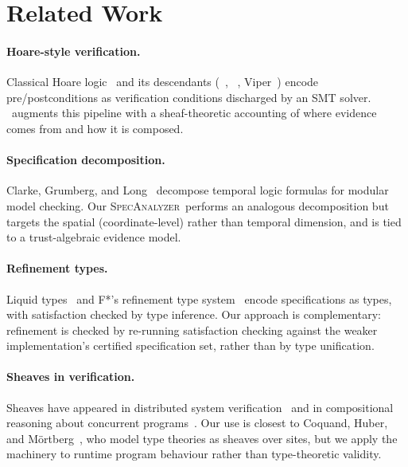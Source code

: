 \documentclass[11pt]{article}
\newcommand{\SpecAn}{\textsc{SpecAnalyzer}}         %
\begin{document}
\section{Related Work}\label{sec:related}

\paragraph{Hoare-style verification.}
Classical Hoare logic~\cite{Hoare1969} and its descendants
(\Dafny~\cite{Leino2010}, \Fstar~\cite{Fstar2016},
Viper~\cite{Viper2016}) encode pre/postconditions as verification
conditions discharged by an SMT solver.  \JuGeo\ augments this
pipeline with a sheaf-theoretic accounting of where evidence comes
from and how it is composed.

\paragraph{Specification decomposition.}
Clarke, Grumberg, and Long~\cite{Clarke1994} decompose temporal logic
formulas for modular model checking.  Our \SpecAn\ performs an
analogous decomposition but targets the spatial (coordinate-level)
rather than temporal dimension, and is tied to a trust-algebraic
evidence model.

\paragraph{Refinement types.}
Liquid types~\cite{LiquidTypes2008} and F*'s refinement type
system~\cite{Fstar2016} encode specifications as types, with
satisfaction checked by type inference.  Our approach is
complementary: refinement is checked by re-running satisfaction
checking against the weaker implementation's certified specification
set, rather than by type unification.

\paragraph{Sheaves in verification.}
Sheaves have appeared in distributed system
verification~\cite{Goguen1992} and in compositional reasoning about
concurrent programs~\cite{Dockins2009}.  Our use is closest to
Coquand, Huber, and M\"{o}rtberg~\cite{Coquand2019}, who model type theories
as sheaves over sites, but we apply the machinery to runtime program
behaviour rather than type-theoretic validity.
\end{document}

